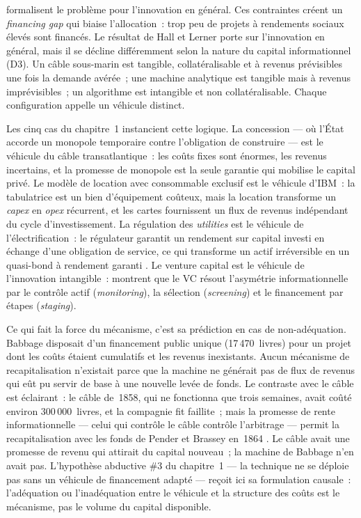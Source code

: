\markINFO \textcite{hall_financing_2010} formalisent le problème pour l'innovation en général.  Ces contraintes créent un \og \emph{financing gap}\fg{} qui biaise l'allocation~: trop peu de projets à rendements sociaux élevés sont financés. Le résultat de Hall et Lerner porte sur l'innovation en général, mais il se décline différemment selon la nature du capital informationnel (D3). Un câble sous-marin est tangible, collatéralisable et à revenus prévisibles une fois la demande avérée~; une machine analytique est tangible mais à revenus imprévisibles~; un algorithme est intangible et non collatéralisable. Chaque configuration appelle un véhicule distinct.

Les cinq cas du chapitre~1 instancient cette logique. La concession --- où l'État accorde un monopole temporaire contre l'obligation de construire --- est le véhicule du câble transatlantique~: les coûts fixes sont énormes, les revenus incertains, et la promesse de monopole est la seule garantie qui mobilise le capital privé. Le modèle de location avec consommable exclusif est le véhicule d'IBM~: la tabulatrice est un bien d'équipement coûteux, mais la location transforme un \emph{capex} en \emph{opex} récurrent, et les cartes fournissent un flux de revenus indépendant du cycle d'investissement. La régulation des \emph{utilities} est le véhicule de l'électrification~: le régulateur garantit un rendement sur capital investi en échange d'une obligation de service, ce qui transforme un actif irréversible en un quasi-bond à rendement garanti \parencite{hughes_networks_1983}. Le venture capital est le véhicule de l'innovation intangible~: \textcite{hall_financing_2010} montrent que le VC résout l'asymétrie informationnelle par le contrôle actif (\emph{monitoring}), la sélection (\emph{screening}) et le financement par étapes (\emph{staging}).

Ce qui fait la force du mécanisme, c'est sa prédiction en cas de non-adéquation. Babbage disposait d'un financement public unique (17\,470~livres) pour un projet dont les coûts étaient cumulatifs et les revenus inexistants. Aucun mécanisme de recapitalisation n'existait parce que la machine ne générait pas de flux de revenus qui eût pu servir de base à une nouvelle levée de fonds. Le contraste avec le câble est éclairant~: le câble de~1858, qui ne fonctionna que trois semaines, avait coûté environ 300\,000~livres, et la compagnie fit faillite~; mais la promesse de rente informationnelle --- celui qui contrôle le câble contrôle l'arbitrage --- permit la recapitalisation avec les fonds de Pender et Brassey en~1864 \parencite{gordon_thread_2002}. Le câble avait une promesse de revenu qui attirait du capital nouveau~; la machine de Babbage n'en avait pas. L'hypothèse abductive \#3 du chapitre~1 --- la technique ne se déploie pas sans un véhicule de financement adapté --- reçoit ici sa formulation causale~: l'adéquation ou l'inadéquation entre le véhicule et la structure des coûts est le mécanisme, pas le volume du capital disponible.

